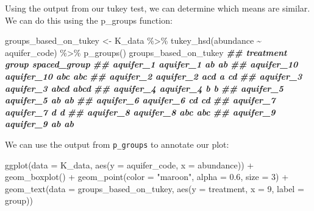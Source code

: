 \documentclass[
]{krantz}
\newenvironment{Shaded}{\begin{snugshade}}{\end{snugshade}}
\newcommand{\AttributeTok}[1]{\textcolor[rgb]{0.77,0.63,0.00}{#1}}
\newcommand{\DecValTok}[1]{\textcolor[rgb]{0.00,0.00,0.81}{#1}}
\newcommand{\DocumentationTok}[1]{\textcolor[rgb]{0.56,0.35,0.01}{\textbf{\textit{#1}}}}
\newcommand{\FloatTok}[1]{\textcolor[rgb]{0.00,0.00,0.81}{#1}}
\newcommand{\FunctionTok}[1]{\textcolor[rgb]{0.00,0.00,0.00}{#1}}
\newcommand{\NormalTok}[1]{#1}
\newcommand{\OtherTok}[1]{\textcolor[rgb]{0.56,0.35,0.01}{#1}}
\newcommand{\SpecialCharTok}[1]{\textcolor[rgb]{0.00,0.00,0.00}{#1}}
\newcommand{\StringTok}[1]{\textcolor[rgb]{0.31,0.60,0.02}{#1}}
\begin{document}
Using the output from our tukey test, we can determine which means are similar. We can do this using the p\_groups function:

\begin{Shaded}
\begin{Highlighting}[]
\NormalTok{groups\_based\_on\_tukey }\OtherTok{\textless{}{-}}\NormalTok{ K\_data }\SpecialCharTok{\%\textgreater{}\%}
  \FunctionTok{tukey\_hsd}\NormalTok{(abundance }\SpecialCharTok{\textasciitilde{}}\NormalTok{ aquifer\_code) }\SpecialCharTok{\%\textgreater{}\%}
  \FunctionTok{p\_groups}\NormalTok{()}
\NormalTok{groups\_based\_on\_tukey}
\DocumentationTok{\#\#             treatment group spaced\_group}
\DocumentationTok{\#\# aquifer\_1   aquifer\_1    ab         ab  }
\DocumentationTok{\#\# aquifer\_10 aquifer\_10   abc         abc }
\DocumentationTok{\#\# aquifer\_2   aquifer\_2   acd         a cd}
\DocumentationTok{\#\# aquifer\_3   aquifer\_3  abcd         abcd}
\DocumentationTok{\#\# aquifer\_4   aquifer\_4     b          b  }
\DocumentationTok{\#\# aquifer\_5   aquifer\_5    ab         ab  }
\DocumentationTok{\#\# aquifer\_6   aquifer\_6    cd           cd}
\DocumentationTok{\#\# aquifer\_7   aquifer\_7     d            d}
\DocumentationTok{\#\# aquifer\_8   aquifer\_8   abc         abc }
\DocumentationTok{\#\# aquifer\_9   aquifer\_9    ab         ab}
\end{Highlighting}
\end{Shaded}

We can use the output from \texttt{p\_groups} to annotate our plot:

\begin{Shaded}
\begin{Highlighting}[]
\FunctionTok{ggplot}\NormalTok{(}\AttributeTok{data =}\NormalTok{ K\_data, }\FunctionTok{aes}\NormalTok{(}\AttributeTok{y =}\NormalTok{ aquifer\_code, }\AttributeTok{x =}\NormalTok{ abundance)) }\SpecialCharTok{+}
  \FunctionTok{geom\_boxplot}\NormalTok{() }\SpecialCharTok{+}
  \FunctionTok{geom\_point}\NormalTok{(}\AttributeTok{color =} \StringTok{"maroon"}\NormalTok{, }\AttributeTok{alpha =} \FloatTok{0.6}\NormalTok{, }\AttributeTok{size =} \DecValTok{3}\NormalTok{) }\SpecialCharTok{+}
  \FunctionTok{geom\_text}\NormalTok{(}\AttributeTok{data =}\NormalTok{ groups\_based\_on\_tukey, }\FunctionTok{aes}\NormalTok{(}\AttributeTok{y =}\NormalTok{ treatment, }\AttributeTok{x =} \DecValTok{9}\NormalTok{, }\AttributeTok{label =}\NormalTok{ group))}
\end{Highlighting}
\end{Shaded}
\end{document}
